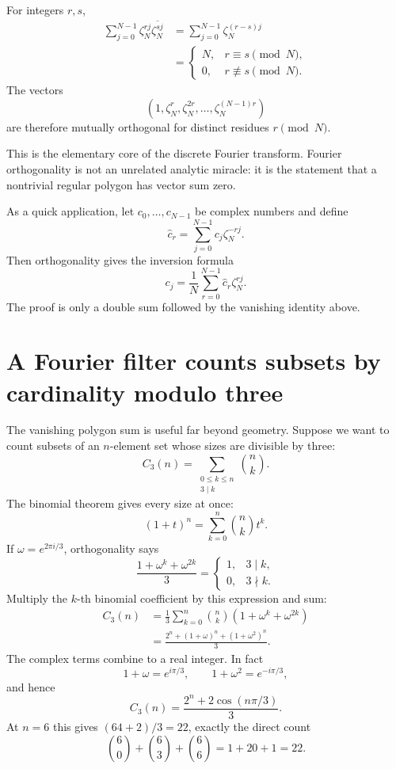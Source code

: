 For integers \(r,s\),
\[
\begin{aligned}
\sum_{j=0}^{N-1}
\zeta_N^{rj}\overline{\zeta_N^{sj}}
&=\sum_{j=0}^{N-1}\zeta_N^{(r-s)j}\\
&=
\begin{cases}
N,&r\equiv s\pmod N,\\
0,&r\not\equiv s\pmod N.
\end{cases}
\end{aligned}
\]
The vectors
\[
  (1,\zeta_N^r,\zeta_N^{2r},\ldots,\zeta_N^{(N-1)r})
\]
are therefore mutually orthogonal for distinct residues \(r\pmod N\).

This is the elementary core of the discrete Fourier transform.  Fourier orthogonality is not an unrelated analytic miracle: it is the statement that a nontrivial regular polygon has vector sum zero.

As a quick application, let \(c_0,\ldots,c_{N-1}\) be complex numbers and define
\[
  \widehat c_r
  =\sum_{j=0}^{N-1}c_j\zeta_N^{-rj}.
\]
Then orthogonality gives the inversion formula
\[
  c_j=\frac1N\sum_{r=0}^{N-1}\widehat c_r\zeta_N^{rj}.
\]
The proof is only a double sum followed by the vanishing identity above.

\section{A Fourier filter counts subsets by cardinality modulo three}

The vanishing polygon sum is useful far beyond geometry. Suppose we want to count subsets of an $n$-element set whose sizes are divisible by three:
\[
 C_3(n)=\sum_{\substack{0\le k\le n\\3\mid k}}\binom nk.
\]
The binomial theorem gives every size at once:
\[
 (1+t)^n=\sum_{k=0}^n\binom nk t^k.
\]
If $\omega=e^{2\pi i/3}$, orthogonality says
\[
 \frac{1+\omega^k+\omega^{2k}}3
 =\begin{cases}1,&3\mid k,\\0,&3\nmid k.\end{cases}
\]
Multiply the $k$-th binomial coefficient by this expression and sum:
\[
 \begin{aligned}
 C_3(n)
 &=\frac13\sum_{k=0}^n
       \binom nk(1+\omega^k+\omega^{2k})\\
 &=\boxed{\frac{2^n+(1+\omega)^n+(1+\omega^2)^n}{3}.}
 \end{aligned}
\]
The complex terms combine to a real integer. In fact
\[
 1+\omega=e^{i\pi/3},\qquad
 1+\omega^2=e^{-i\pi/3},
\]
and hence
\[
 \boxed{C_3(n)=\frac{2^n+2\cos(n\pi/3)}3.}
\]
At $n=6$ this gives $(64+2)/3=22$, exactly the direct count
\[
 \binom60+\binom63+\binom66=1+20+1=22.
\]

